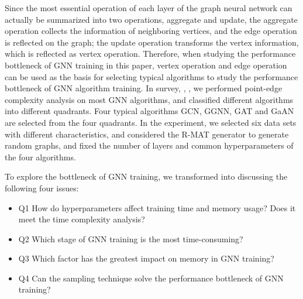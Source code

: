Since the most essential operation of each layer of the graph neural network can actually be summarized into two operations,
aggregate and update, the aggregate operation collects the information of neighboring vertices, 
and the edge operation is reflected on the graph; the update operation transforms the vertex information, 
which is reflected as vertex operation. Therefore, when studying the performance bottleneck of GNN training in this paper,
vertex operation and edge operation can be used as the basis for selecting typical algorithms to
study the performance bottleneck of GNN algorithm training. In survey\cite{comprehensive-survey-wu-2020}, \cite{zhou2018_gnn_review}, \cite{zhang2018_gnn_survey}, 
we performed point-edge complexity analysis on most GNN algorithms, and classified different algorithms into different quadrants. 
Four typical algorithms GCN, GGNN, GAT and GaAN are selected from the four quadrants. 
In the experiment, we selected six data sets with different characteristics, and considered the R-MAT generator to generate random graphs, 
and fixed the number of layers and common hyperparameters of the four algorithms. \par
To explore the bottleneck of GNN training, we transformed into discussing the following four issues:
\begin{itemize}
    \item Q1 How do hyperparameters affect training time and memory usage? Does it meet the time complexity analysis?
    \item Q2 Which stage of GNN training is the most time-consuming?
    \item Q3 Which factor has the greatest impact on memory in GNN training?
    \item Q4 Can the sampling technique solve the performance bottleneck of GNN training?
\end{itemize}

